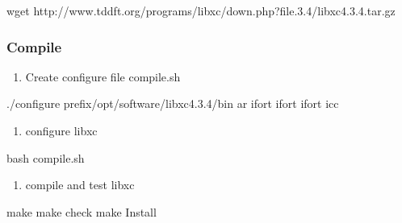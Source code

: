 \documentclass[a4paper,12pt,english]{sphinxmanual}
\begin{document}
\begin{sphinxVerbatim}[commandchars=\\\{\}]
wget http://www.tddft.org/programs/libxc/down.php?file.3.4/libxc\PYGZhy{}4.3.4.tar.gz
\end{sphinxVerbatim}


\subsubsection{Compile}
\label{\detokenize{compile/libxc_4.3.4:compile}}\begin{enumerate}
%
\item {} 
\sphinxAtStartPar
Create configure file compile.sh

\end{enumerate}

\begin{sphinxVerbatim}[commandchars=\\\{\}]
./configure \PYGZhy{}\PYGZhy{}prefix/opt/software/libxc\PYGZhy{}4.3.4/bin 
    ar 
    ifort 
    ifort 
    ifort 
    icc
\end{sphinxVerbatim}
\begin{enumerate}
%
\setcounter{enumi}{1}
\item {} 
\sphinxAtStartPar
configure libxc

\end{enumerate}

\begin{sphinxVerbatim}[commandchars=\\\{\}]
bash compile.sh
\end{sphinxVerbatim}
\begin{enumerate}
%
\setcounter{enumi}{2}
\item {} 
\sphinxAtStartPar
compile and test libxc

\end{enumerate}

\begin{sphinxVerbatim}[commandchars=\\\{\}]
make  make check  make Install
\end{sphinxVerbatim}
\end{document}
